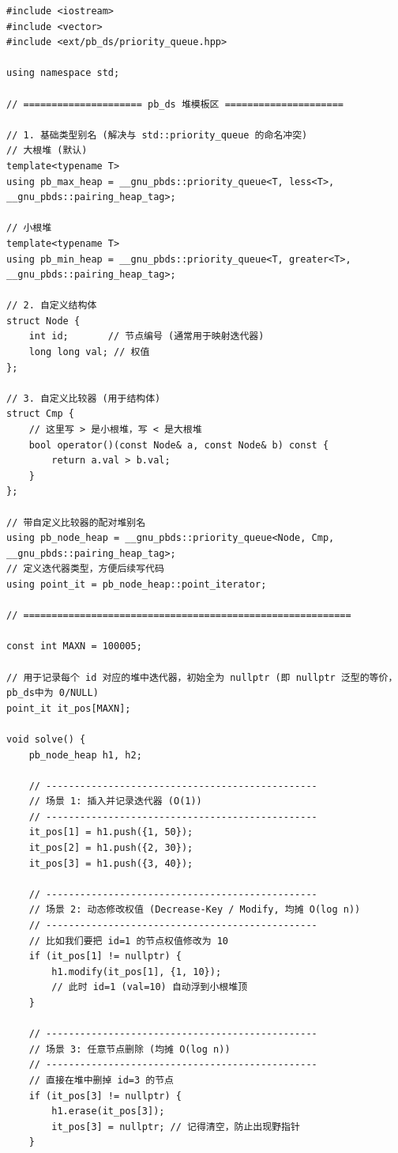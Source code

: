 \begin{lstlisting}
#include <iostream>
#include <vector>
#include <ext/pb_ds/priority_queue.hpp>

using namespace std;

// ===================== pb_ds 堆模板区 =====================

// 1. 基础类型别名 (解决与 std::priority_queue 的命名冲突)
// 大根堆 (默认)
template<typename T>
using pb_max_heap = __gnu_pbds::priority_queue<T, less<T>, __gnu_pbds::pairing_heap_tag>;

// 小根堆
template<typename T>
using pb_min_heap = __gnu_pbds::priority_queue<T, greater<T>, __gnu_pbds::pairing_heap_tag>;

// 2. 自定义结构体
struct Node {
    int id;       // 节点编号 (通常用于映射迭代器)
    long long val; // 权值
};

// 3. 自定义比较器 (用于结构体)
struct Cmp {
    // 这里写 > 是小根堆，写 < 是大根堆
    bool operator()(const Node& a, const Node& b) const {
        return a.val > b.val; 
    }
};

// 带自定义比较器的配对堆别名
using pb_node_heap = __gnu_pbds::priority_queue<Node, Cmp, __gnu_pbds::pairing_heap_tag>;
// 定义迭代器类型，方便后续写代码
using point_it = pb_node_heap::point_iterator;

// ==========================================================

const int MAXN = 100005;

// 用于记录每个 id 对应的堆中迭代器，初始全为 nullptr (即 nullptr 泛型的等价，pb_ds中为 0/NULL)
point_it it_pos[MAXN]; 

void solve() {
    pb_node_heap h1, h2;

    // ------------------------------------------------
    // 场景 1: 插入并记录迭代器 (O(1))
    // ------------------------------------------------
    it_pos[1] = h1.push({1, 50});
    it_pos[2] = h1.push({2, 30});
    it_pos[3] = h1.push({3, 40});

    // ------------------------------------------------
    // 场景 2: 动态修改权值 (Decrease-Key / Modify, 均摊 O(log n))
    // ------------------------------------------------
    // 比如我们要把 id=1 的节点权值修改为 10
    if (it_pos[1] != nullptr) {
        h1.modify(it_pos[1], {1, 10}); 
        // 此时 id=1 (val=10) 自动浮到小根堆顶
    }

    // ------------------------------------------------
    // 场景 3: 任意节点删除 (均摊 O(log n))
    // ------------------------------------------------
    // 直接在堆中删掉 id=3 的节点
    if (it_pos[3] != nullptr) {
        h1.erase(it_pos[3]);
        it_pos[3] = nullptr; // 记得清空，防止出现野指针
    }


\end{lstlisting}
